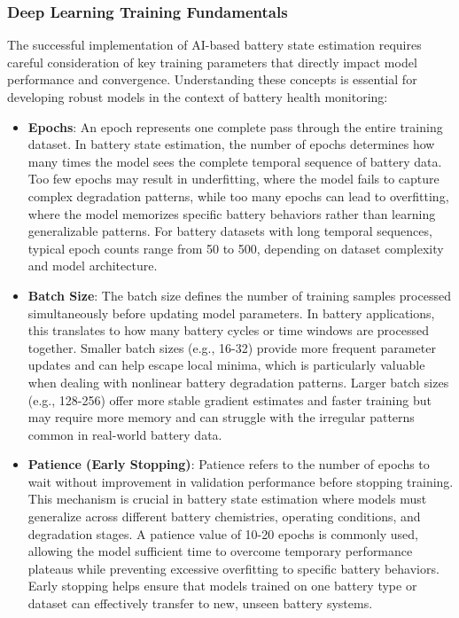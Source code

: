 \subsubsection{Deep Learning Training Fundamentals}
The successful implementation of AI-based battery state estimation requires careful consideration of key training parameters that directly impact model performance and convergence. Understanding these concepts is essential for developing robust models in the context of battery health monitoring:

\begin{itemize}
    \item \textbf{Epochs}: An epoch represents one complete pass through the entire training dataset. In battery state estimation, the number of epochs determines how many times the model sees the complete temporal sequence of battery data. Too few epochs may result in underfitting, where the model fails to capture complex degradation patterns, while too many epochs can lead to overfitting, where the model memorizes specific battery behaviors rather than learning generalizable patterns. For battery datasets with long temporal sequences, typical epoch counts range from 50 to 500, depending on dataset complexity and model architecture.

    \item \textbf{Batch Size}: The batch size defines the number of training samples processed simultaneously before updating model parameters. In battery applications, this translates to how many battery cycles or time windows are processed together. Smaller batch sizes (e.g., 16-32) provide more frequent parameter updates and can help escape local minima, which is particularly valuable when dealing with nonlinear battery degradation patterns. Larger batch sizes (e.g., 128-256) offer more stable gradient estimates and faster training but may require more memory and can struggle with the irregular patterns common in real-world battery data.

    \item \textbf{Patience (Early Stopping)}: Patience refers to the number of epochs to wait without improvement in validation performance before stopping training. This mechanism is crucial in battery state estimation where models must generalize across different battery chemistries, operating conditions, and degradation stages. A patience value of 10-20 epochs is commonly used, allowing the model sufficient time to overcome temporary performance plateaus while preventing excessive overfitting to specific battery behaviors. Early stopping helps ensure that models trained on one battery type or dataset can effectively transfer to new, unseen battery systems.
\end{itemize}



